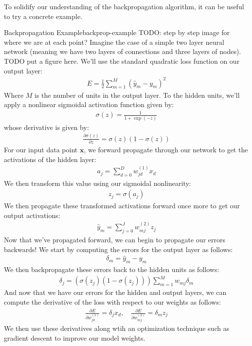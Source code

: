 To solidify our understanding of the backpropagation algorithm, it can be useful to try a concrete example.

\begin{example}{Backpropagation Example}{backprop-example}
	TODO: step by step image for where we are at each point?
	Imagine the case of a simple two layer neural network (meaning we have two layers of connections and three layers of nodes). TODO put a figure here. We'll use the standard quadratic loss function on our output layer:
	\begin{align*}
		E = \frac{1}{2} \sum_{m=1}^{M} (\hat{y}_{m} - y_{m})^{2}
	\end{align*}
	Where $M$ is the number of units in the output layer. To the hidden units, we'll apply a nonlinear sigmoidal activation function given by:
	\begin{align*}
		\sigma(z) = \frac{1}{1 + \exp{(-z)}}
	\end{align*}
	whose derivative is given by:
	\begin{align*}
		\frac{\partial \sigma(z)}{\partial z} = \sigma(z)(1 - \sigma(z))
	\end{align*}
	For our input data point $\textbf{x}$, we forward propagate through our network to get the activations of the hidden layer:
	\begin{align*}
		a_{j} = \sum_{d=0}^{D} w_{jd}^{(1)} x_{d}
	\end{align*}
	We then transform this value using our sigmoidal nonlinearity:
	\begin{align*}
		z_{j} = \sigma{(a_{j})}
	\end{align*}
	We then propagate these transformed activations forward once more to get our output activations:
	\begin{align*}
		\hat{y}_{m} = \sum_{j=0}^{J} w_{mj}^{(2)} z_{j}
	\end{align*}
	Now that we've propagated forward, we can begin to propagate our errors backwards! We start by computing the errors for the output layer as follows:
	\begin{align*}
		\delta_{m} = \hat{y}_{m} - y_{m}
	\end{align*}
	We then backpropagate these errors back to the hidden units as follows:
	\begin{align*}
		\delta_{j} = (\sigma(z_{j})(1 - \sigma(z_{j}))) \sum_{m=1}^{M} w_{mj} \delta_{m}
	\end{align*}
	And now that we have our errors for the hidden and output layers, we can compute the derivative of the loss with respect to our weights as follows:
	\begin{align*}
		\frac{\partial E}{\partial w_{jd}^{(1)}} = \delta_{j} x_{d}, \quad \frac{\partial E}{\partial w_{mj}^{(2)}} = \delta_{m} z_{j}
	\end{align*}
	We then use these derivatives along wtih an optimization technique such as gradient descent to improve our model weights.
\end{example}

